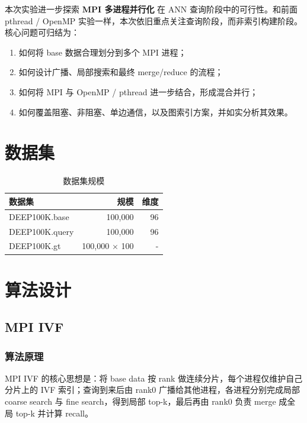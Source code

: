 \documentclass[a4paper]{article}
\begin{document}
本次实验进一步探索 \textbf{MPI 多进程并行化} 在 ANN 查询阶段中的可行性。和前面 pthread / OpenMP 实验一样，本次依旧重点关注查询阶段，而非索引构建阶段。核心问题可归结为：

\begin{enumerate}
    \item 如何将 base 数据合理划分到多个 MPI 进程；
    \item 如何设计广播、局部搜索和最终 merge/reduce 的流程；
    \item 如何将 MPI 与 OpenMP / pthread 进一步结合，形成混合并行；
    \item 如何覆盖阻塞、非阻塞、单边通信，以及图索引方案，并如实分析其效果。
\end{enumerate}




\section{数据集}

\begin{table}[H]
\centering
\begin{tabular}{lrr}
\toprule
数据集 & 规模 & 维度 \\
\midrule
DEEP100K.base & 100,000 & 96 \\
DEEP100K.query & 100,000 & 96 \\
DEEP100K.gt & 100,000 $\times$ 100 & - \\
\bottomrule
\end{tabular}
\caption{数据集规模}
\end{table}


\section{算法设计}

\subsection{MPI IVF }

\subsubsection{算法原理}

MPI IVF 的核心思想是：将 base data 按 rank 做连续分片，每个进程仅维护自己分片上的 IVF 索引；查询到来后由 rank0 广播给其他进程，各进程分别完成局部 coarse search 与 fine search，得到局部 top-k，最后再由 rank0 负责 merge 成全局 top-k 并计算 recall。
\end{document}
